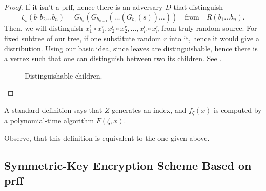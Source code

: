 \begin{proof}
	If it isn't a prff, hence there is an adversary $D$ that distinguish 
	 \[
		 \zeta_s(b_1 b_2 \ldots b_n) = G_{b_n}(G_{b_{n - 1}}(\ldots (G_{b_1}(s)) \ldots)) \quad \text{from} \quad R(b_1 \ldots b_n)
	.\] 
	Then, we will distinguish $x_1^{l} \circ x_1^{r}, x_2^{l} \circ x_2^{r}, \ldots, x_{p}^{l} \circ x_{p}^{r}$ from truly random source.
	For fixed subtree of our tree, if one substitute random $r$ into it, hence it would give a distribution.
	Using our basic idea, since leaves are distinguishable, hence there is a vertex such that one can distinguish between two its children.
	See .
		\begin{figure}[htpb]
		\centering
		\caption{Distinguishable children.}
		\label{fig:distinguishable_children}
	\end{figure}

\end{proof}
\begin{remark}
A standard definition says that $Z$ generates an index, and  $f_{\zeta}(x)$ is computed by a polynomial-time algorithm $F(\zeta, x)$.
\end{remark}
\begin{exercise}
	Observe, that this definition is equivalent to the one given above.
\end{exercise}

\subsection{Symmetric-Key Encryption Scheme Based on prff}

